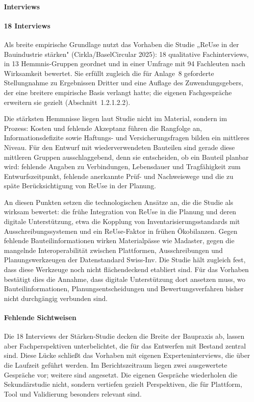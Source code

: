 \documentclass[type=zwischenbericht]{zukunftbau}
\begin{document}
\paragraph{Interviews}
\begin{SemioNest}
\paragraph{18 Interviews}
Als breite empirische Grundlage nutzt das Vorhaben die Studie „ReUse in der Bauindustrie stärken" (Cirkla/BaselCircular 2025): 18 qualitative Fachinterviews, in 13 Hemmnis-Gruppen geordnet und in einer Umfrage mit 94 Fachleuten nach Wirksamkeit bewertet. Sie erfüllt zugleich die für Anlage~8 geforderte Stellungnahme zu Ergebnissen Dritter und eine Auflage des Zuwendungsgebers, der eine breitere empirische Basis verlangt hatte; die eigenen Fachgespräche erweitern sie gezielt (Abschnitt~1.2.1.2.2).

Die stärksten Hemmnisse liegen laut Studie nicht im Material, sondern im Prozess: Kosten und fehlende Akzeptanz führen die Rangfolge an, Informationsdefizite sowie Haftungs- und Versicherungsfragen bilden ein mittleres Niveau. Für den Entwurf mit wiederverwendeten Bauteilen sind gerade diese mittleren Gruppen ausschlaggebend, denn sie entscheiden, ob ein Bauteil planbar wird: fehlende Angaben zu Verbindungen, Lebensdauer und Tragfähigkeit zum Entwurfszeitpunkt, fehlende anerkannte Prüf- und Nachweiswege und die zu späte Berücksichtigung von ReUse in der Planung.

An diesen Punkten setzen die technologischen Ansätze an, die die Studie als wirksam bewertet: die frühe Integration von ReUse in die Planung und deren digitale Unterstützung, etwa die Kopplung von Inventarisierungsstandards mit Ausschreibungssystemen und ein ReUse-Faktor in frühen Ökobilanzen. Gegen fehlende Bauteilinformationen wirken Materialpässe wie Madaster, gegen die mangelnde Interoperabilität zwischen Plattformen, Ausschreibungen und Planungswerkzeugen der Datenstandard Swiss-Inv. Die Studie hält zugleich fest, dass diese Werkzeuge noch nicht flächendeckend etabliert sind. Für das Vorhaben bestätigt dies die Annahme, dass digitale Unterstützung dort ansetzen muss, wo Bauteilinformationen, Planungsentscheidungen und Bewertungsverfahren bisher nicht durchgängig verbunden sind.

\paragraph{Fehlende Sichtweisen}
Die 18 Interviews der Stärken-Studie decken die Breite der Baupraxis ab, lassen aber Fachperspektiven unterbelichtet, die für das Entwerfen mit Bestand zentral sind. Diese Lücke schließt das Vorhaben mit eigenen Experteninterviews, die über die Laufzeit geführt werden. Im Berichtszeitraum liegen zwei ausgewertete Gespräche vor; weitere sind angesetzt. Die eigenen Gespräche wiederholen die Sekundärstudie nicht, sondern vertiefen gezielt Perspektiven, die für Plattform, Tool und Validierung besonders relevant sind.


\end{SemioNest}
\end{document}
